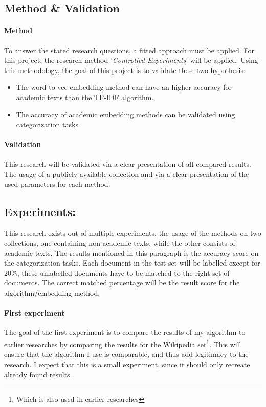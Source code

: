 \documentclass[10pt,a4paper]{article}
\begin{document}
\subsection{Method \& Validation}
\paragraph{Method} To answer the stated research questions, a fitted approach must be applied. For this project, the research method '\textit{Controlled Experiments}' will be applied. Using this methodology, the goal of this project is to validate these two hypothesis:
\begin{itemize}
\item{The word-to-vec embedding method can have an higher accuracy for academic texts than the TF-IDF algorithm.}
\item{The accuracy of academic embedding methods can be validated using categorization tasks}
\end{itemize}
\paragraph{Validation} This research will be validated via a clear presentation of all compared results. The usage of a publicly available collection and via a clear presentation of the used parameters for each method.

\subsection{Experiments:}
This research exists out of multiple experiments, the usage of the methods on two collections, one containing non-academic texts, while the other consists of academic texts. The results mentioned in this paragraph is the accuracy score on the categorization tasks. Each document in the test set will be labelled except for 20\%, these unlabelled documents have to be matched to the right set of documents. The correct matched percentage will be the result score for the algorithm/embedding method.\\
\paragraph{First experiment}The goal of the first experiment is to compare the results of my algorithm to earlier researches by comparing the results for the Wikipedia set\footnote{Which is also used in earlier researches}. This will ensure that the algorithm I use is comparable, and thus add legitimacy to the research. I expect that this is a small experiment, since it should only recreate already found results.\\
\end{document}
